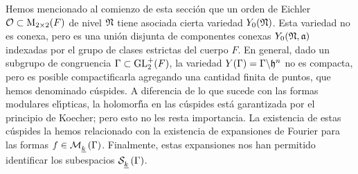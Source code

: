 % 

Hemos mencionado al comienzo de esta secci\'{o}n que un orden de Eichler
$\cal{O}\subset\MM_{2\times 2}(F)$ de nivel $\frak{N}$ tiene asociada cierta
variedad $Y_{0}(\frak{N})$. Esta variedad no es conexa, pero es una uni\'{o}n
disjunta de componentes conexas $Y_{0}(\frak{N},\frak{a})$ indexadas por el
grupo de clases estrictas del cuerpo $F$. En general, dado un subgrupo de
congruencia $\Gamma\subset\GLtp_{2}(F)$, la variedad
$Y(\Gamma)=\Gamma\backslash\hP^{n}$ no es compacta, pero es posible
compactificarla agregando una cantidad finita de puntos, que hemos denominado
c\'{u}spides. A diferencia de lo que sucede con las formas modulares
el\'{\i}pticas, la holomorf\'{\i}a en las c\'{u}spides est\'{a} garantizada por
el principio de Koecher; pero esto no les resta importancia. La existencia de
estas c\'{u}spides la hemos relacionado con la existencia de expansiones de
Fourier para las formas $f\in\modularH{k}{\Gamma}$. Finalmente, estas
expansiones nos han permitido identificar los subespacios $\spitzH{k}{\Gamma}$.

